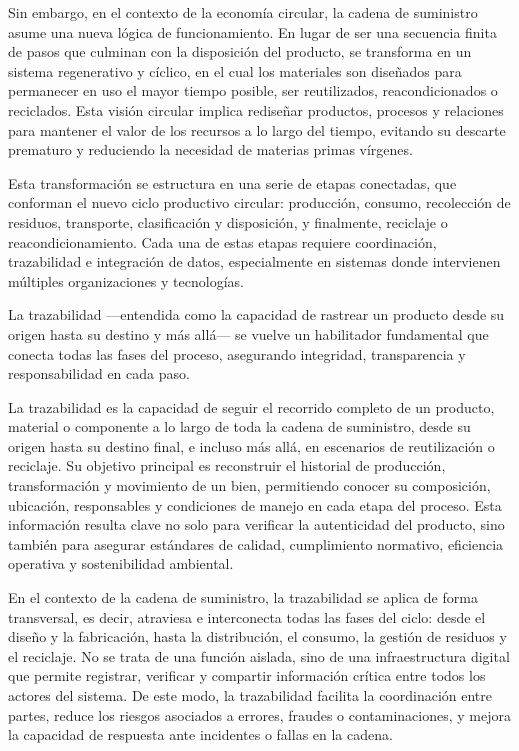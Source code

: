 Sin embargo, en el contexto de la economía circular, la cadena de suministro asume una nueva lógica de funcionamiento. En lugar de ser una secuencia finita de pasos que culminan con la disposición del producto, se transforma en un sistema regenerativo y cíclico, en el cual los materiales son diseñados para permanecer en uso el mayor tiempo posible, ser reutilizados, reacondicionados o reciclados. Esta visión circular implica rediseñar productos, procesos y relaciones para mantener el valor de los recursos a lo largo del tiempo, evitando su descarte prematuro y reduciendo la necesidad de materias primas vírgenes.

Esta transformación se estructura en una serie de etapas conectadas, que conforman el nuevo ciclo productivo circular: producción, consumo, recolección de residuos, transporte, clasificación y disposición, y finalmente, reciclaje o reacondicionamiento. Cada una de estas etapas requiere coordinación, trazabilidad e integración de datos, especialmente en sistemas donde intervienen múltiples organizaciones y tecnologías. 

La trazabilidad —entendida como la capacidad de rastrear un producto desde su origen hasta su destino y más allá— se vuelve un habilitador fundamental que conecta todas las fases del proceso, asegurando integridad, transparencia y responsabilidad en cada paso.


La trazabilidad es la capacidad de seguir el recorrido completo de un producto, material o componente a lo largo de toda la cadena de suministro, desde su origen hasta su destino final, e incluso más allá, en escenarios de reutilización o reciclaje. Su objetivo principal es reconstruir el historial de producción, transformación y movimiento de un bien, permitiendo conocer su composición, ubicación, responsables y condiciones de manejo en cada etapa del proceso. Esta información resulta clave no solo para verificar la autenticidad del producto, sino también para asegurar estándares de calidad, cumplimiento normativo, eficiencia operativa y sostenibilidad ambiental.

En el contexto de la cadena de suministro, la trazabilidad se aplica de forma transversal, es decir, atraviesa e interconecta todas las fases del ciclo: desde el diseño y la fabricación, hasta la distribución, el consumo, la gestión de residuos y el reciclaje. No se trata de una función aislada, sino de una infraestructura digital que permite registrar, verificar y compartir información crítica entre todos los actores del sistema. De este modo, la trazabilidad facilita la coordinación entre partes, reduce los riesgos asociados a errores, fraudes o contaminaciones, y mejora la capacidad de respuesta ante incidentes o fallas en la cadena.

